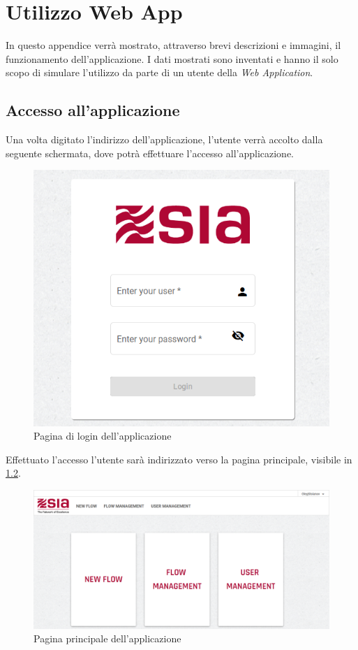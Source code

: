 \chapter{Utilizzo Web App}
\label{app:a}
In questo appendice verrà mostrato, attraverso brevi descrizioni e immagini, il funzionamento  dell'applicazione. I dati mostrati sono inventati e hanno il solo scopo di simulare l'utilizzo da parte di un utente della \textit{Web Application}.

\section{Accesso all'applicazione}

Una volta digitato l'indirizzo dell'applicazione, l'utente verrà accolto dalla seguente schermata, dove potrà effettuare l'accesso all'applicazione.

\begin{figure}
\begin{center}
\includegraphics[width=0.7\columnwidth]{images/login1.png}
\end{center}
\caption{Pagina di login dell'applicazione}
\label{fig:login}
\end{figure}


Effettuato l'accesso l'utente sarà indirizzato verso la pagina principale, visibile in \ref{fig:home}.

\begin{figure}
\begin{center}
\includegraphics[width=1.0\columnwidth]{images/home.png}
\end{center}
\caption{Pagina principale dell'applicazione}
\label{fig:home}
\end{figure}


